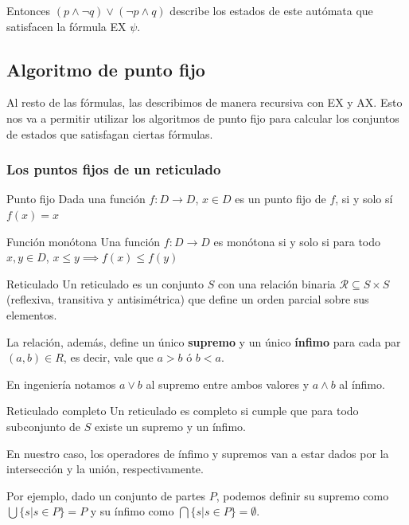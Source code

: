 Entonces $(p \land\lnot q) \lor (\lnot p \land q )$ describe los estados de este autómata que satisfacen la fórmula EX $\psi$. 

\subsection{Algoritmo de punto fijo}
Al resto de las fórmulas, las describimos de manera recursiva con EX y AX. Esto nos va a permitir utilizar los algoritmos de punto fijo para calcular los conjuntos de estados que satisfagan ciertas fórmulas.

\subsubsection{Los puntos fijos de un reticulado}
\begin{definicion}{Punto fijo}
Dada una función $f:D\to D$, $x\in D$ es un punto fijo de $f$, si y solo sí $f(x)=x$
\end{definicion}

\begin{definicion}{Función monótona}
Una función $f:D\to D$ es monótona si y solo si para todo $x,y\in D$, $x\leq y \implies f(x) \leq f(y)$
\end{definicion}


\begin{definicion}{Reticulado}
Un reticulado es un conjunto $S$ con una relación binaria $\mathcal{R}\subseteq S\times S$ (reflexiva, transitiva y antisimétrica) que define un orden parcial sobre sus elementos.

La relación, además, define un único \textbf{supremo} y un único \textbf{ínfimo} para cada par $(a,b)\in R$, es decir, vale que $a > b$ ó $b < a$.

En ingeniería notamos $a\lor b$ al supremo entre ambos valores y $a \land b$ al ínfimo.
\end{definicion}

\begin{definicion}{Reticulado completo}
Un reticulado es completo si cumple que para todo subconjunto de $S$ existe un supremo y un ínfimo.
\end{definicion}

En nuestro caso, los operadores de ínfimo y supremos van a estar dados por la intersección y la unión, respectivamente.

Por ejemplo, dado un conjunto de partes $P$, podemos definir su supremo como $ \bigcup\{ s | s \in P\} = P$ y su ínfimo como $\bigcap\{s | s \in P\} = \emptyset$.

